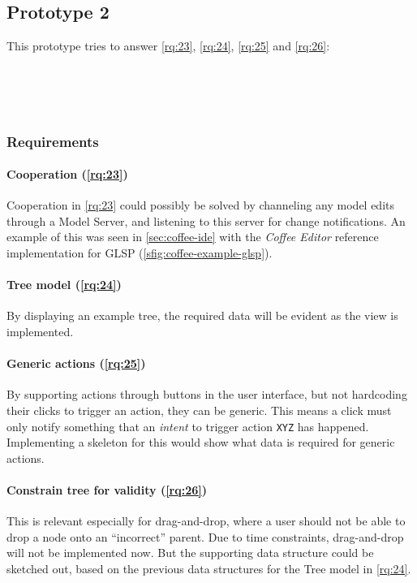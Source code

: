 \subsection{Prototype 2}

This prototype tries to answer \cref{rq:23}, \cref{rq:24}, \cref{rq:25} and \cref{rq:26}:
\begin{displayquote}
  \\
  \\
  \\
  
\end{displayquote}

\subsubsection{Requirements}

\paragraph*{Cooperation (\cref{rq:23})}
Cooperation in \cref{rq:23} could possibly be solved by channeling any model edits through a Model Server, and listening to this server for change notifications. An example of this was seen in \cref{sec:coffee-ide} with the \emph{Coffee Editor} reference implementation for \gls{GLSP} (\cref{sfig:coffee-example-glsp}).

\paragraph*{Tree model (\cref{rq:24})}
By displaying an example tree, the required data will be evident as the view is implemented.

\paragraph*{Generic actions (\cref{rq:25})}
By supporting actions through buttons in the user interface, but not hardcoding their clicks to trigger an action, they can be generic.
This means a click must only notify something that an \emph{intent} to trigger action \texttt{XYZ} has happened.
Implementing a skeleton for this would show what data is required for generic actions.

\paragraph*{Constrain tree for validity (\cref{rq:26})}
This is relevant especially for drag-and-drop, where a user should not be able to drop a node onto an ``incorrect'' parent.
Due to time constraints, drag-and-drop will not be implemented now.
But the supporting data structure could be sketched out, based on the previous data structures for the Tree model in \cref{rq:24}.

